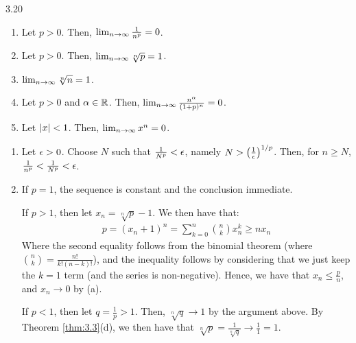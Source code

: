 \setcounter{rudin}{19}
\begin{theorem}{}{3.20}
    \begin{enumerate}
        \item Let $p > 0$. Then, $\lim_{n \rightarrow \infty} \frac{1}{n^p} = 0$.
        \item Let $p > 0$. Then, $\lim_{n \rightarrow \infty} \sqrt[n]{p} = 1$.
        \item $\lim_{n \rightarrow \infty} \sqrt[n]{n} = 1$.
        \item Let $p > 0$ and $\alpha \in \mathbb{R}$. Then, $\lim_{n \rightarrow \infty} \frac{n^\alpha}{(1+p)^n} = 0$.
        \item Let $\abs{x} < 1$. Then, $\lim_{n \rightarrow \infty} x^n = 0$. 
    \end{enumerate}
\end{theorem}
\begin{nproof}
    \begin{enumerate}
        \item Let $\epsilon > 0$. Choose $N$ such that $\frac{1}{N^p} < \epsilon$, namely $N > \left(\frac{1}{\epsilon}\right)^{1/p}$. Then, for $n \geq N$, $\frac{1}{n^p} < \frac{1}{N^p} < \epsilon$. 
        
        \item If $p = 1$, the sequence is constant and the conclusion immediate. 
        
        If $p > 1$, then let $x_n = \sqrt[n]{p} - 1$. We then have that:
        \begin{align*}
            p = (x_n + 1)^n = \sum_{k=0}^n \binom{n}{k}x_n^k \geq nx_n
        \end{align*}
        Where the second equality follows from the binomial theorem (where $\binom{n}{k} = \frac{n!}{k!(n-k)!}$), and the inequality follows by considering that we just keep the $k = 1$ term (and the series is non-negative). Hence, we have that $x_n \leq \frac{p}{n}$, and $x_n \rightarrow 0$ by (a). 
        
        If $p < 1$, then let $q = \frac{1}{p} > 1$. Then, $\sqrt[n]{q} \rightarrow 1$ by the argument above. By Theorem \ref{thm:3.3}(d), we then have that $\sqrt[n]{p} = \frac{1}{\sqrt[n]{q}} \rightarrow \frac{1}{1} = 1$.


\end{enumerate}
\end{nproof}
